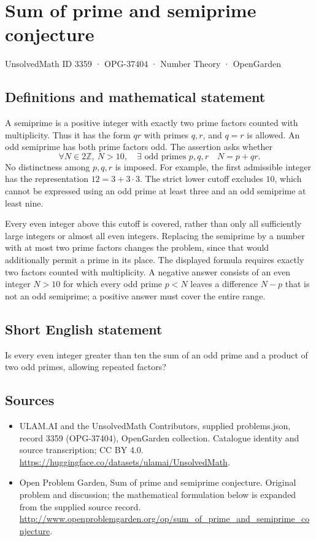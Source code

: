 \documentclass[11pt,a4paper]{article}
\begin{document}
\section*{Sum of prime and semiprime conjecture}\label{3359}
{\small UnsolvedMath ID 3359 · OPG-37404 · Number Theory · OpenGarden}
\subsection{Definitions and mathematical statement}
A semiprime is a positive integer with exactly two prime factors
counted with multiplicity. Thus it has the form $qr$ with primes
$q,r$, and $q=r$ is allowed. An odd semiprime has both prime factors
odd. The assertion asks whether
\[
 \forall N\in2\mathbb Z,\ N>10,\quad
 \exists\text{ odd primes }p,q,r\quad N=p+qr.
\]
No distinctness among $p,q,r$ is imposed. For example, the first
admissible integer has the representation $12=3+3\cdot3$.
The strict lower cutoff excludes $10$, which cannot be expressed
using an odd prime at least three and an odd semiprime at least nine.

Every even integer above this cutoff is covered, rather than only
all sufficiently large integers or almost all even integers. Replacing
the semiprime by a number with at most two prime factors changes the
problem, since that would additionally permit a prime in its place.
The displayed formula requires exactly two factors counted with
multiplicity. A negative answer consists of an even integer $N>10$
for which every odd prime $p<N$ leaves a difference $N-p$ that is
not an odd semiprime; a positive answer must cover the entire range.
\subsection{Short English statement}
Is every even integer greater than ten the sum of an odd prime and a product of two odd primes, allowing repeated factors?
\subsection{Sources}
\begin{itemize}
\item[S1] ULAM.AI and the UnsolvedMath Contributors, supplied problems.json, record 3359 (OPG-37404), OpenGarden collection. Catalogue identity and source transcription; CC BY 4.0.
\url{https://huggingface.co/datasets/ulamai/UnsolvedMath}.
\item[S2] Open Problem Garden, Sum of prime and semiprime conjecture. Original problem and discussion; the mathematical formulation below is expanded from the supplied source record.
\url{http://www.openproblemgarden.org/op/sum_of_prime_and_semiprime_conjecture}.
\end{itemize}
\end{document}
